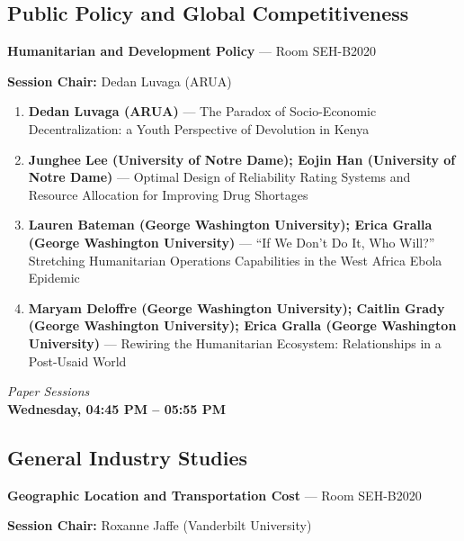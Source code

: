 \documentclass[
  10pt,
  letterpaper,
  DIV=11,
  numbers=noendperiod]{scrartcl}
\begin{document}
\subsection{\texorpdfstring{\textcolor{policy}{Public Policy and Global Competitiveness}}{}}\label{section-13}

\textbf{Humanitarian and Development Policy} --- Room SEH-B2020

\textbf{Session Chair:} Dedan Luvaga (ARUA)

\begin{enumerate}
\def\labelenumi{\arabic{enumi}.}
\item
  \textbf{Dedan Luvaga (ARUA)} --- The Paradox of Socio-Economic
  Decentralization: a Youth Perspective of Devolution in Kenya
\item
  \textbf{Junghee Lee (University of Notre Dame); Eojin Han (University
  of Notre Dame)} --- Optimal Design of Reliability Rating Systems and
  Resource Allocation for Improving Drug Shortages
\item
  \textbf{Lauren Bateman (George Washington University); Erica Gralla
  (George Washington University)} --- ``If We Don't Do It, Who Will?''
  Stretching Humanitarian Operations Capabilities in the West Africa
  Ebola Epidemic
\item
  \textbf{Maryam Deloffre (George Washington University); Caitlin Grady
  (George Washington University); Erica Gralla (George Washington
  University)} --- Rewiring the Humanitarian Ecosystem: Relationships in
  a Post-Usaid World
\end{enumerate}

\newpage


\begin{center}
\normalsize\textit{Paper Sessions}\\[0.3em]
\Large\textbf{Wednesday, 04:45 PM – 05:55 PM}
\end{center}

\subsection{\texorpdfstring{\textcolor{gis}{General Industry Studies}}{}}\label{section-14}

\textbf{Geographic Location and Transportation Cost} --- Room SEH-B2020

\textbf{Session Chair:} Roxanne Jaffe (Vanderbilt University)
\end{document}
